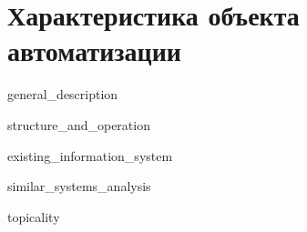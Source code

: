 \section{Характеристика объекта автоматизации}


{general_description}


{structure_and_operation}


{existing_information_system}


{similar_systems_analysis}


{topicality}
